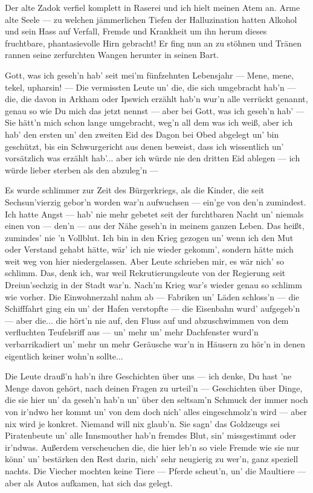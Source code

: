 Der alte Zadok verfiel komplett in Raserei und ich hielt meinen Atem an. Arme alte Seele --- zu welchen jämmerlichen Tiefen der Halluzination hatten Alkohol und sein Hass auf Verfall, Fremde und Krankheit um ihn herum dieses fruchtbare, phantasievolle Hirn gebracht! Er fing nun an zu stöhnen und Tränen rannen seine zerfurchten Wangen herunter in seinen Bart.

\glqq Gott, was ich geseh'n hab' seit mei'm fünfzehnten Lebensjahr --- Mene, mene, tekel, upharsin! --- Die vermissten Leute un' die, die sich umgebracht hab'n --- die, die davon in Arkham oder Ipswich erzählt hab'n wur'n alle verrückt genannt, genau so wie Du mich das jetzt nennst --- aber bei Gott, was ich geseh'n hab' --- Sie hätt'n mich schon lange umgebracht, weg'n all dem was ich weiß, aber ich hab' den ersten un' den zweiten Eid des Dagon bei Obed abgelegt un' bin geschützt, bis ein Schwurgericht aus denen beweist, dass ich wissentlich un' vorsätzlich was erzählt hab'... aber ich würde nie den dritten Eid ablegen --- ich würde lieber sterben als den abzuleg'n ---

Es wurde schlimmer zur Zeit des Bürgerkriegs, als die Kinder, die seit Sechsun'vierzig gebor'n worden war'n aufwuchsen --- ein'ge von den'n zumindest. Ich hatte Angst --- hab' nie mehr gebetet seit der furchtbaren Nacht un' niemals einen von --- den'n --- aus der Nähe geseh'n in meinem ganzen Leben. Das heißt, zumindes' nie 'n Vollblut. Ich bin in den Krieg gezogen un' wenn ich den Mut oder Verstand gehabt hätte, wär' ich nie wieder gekomm', sondern hätte mich weit weg von hier niedergelassen. Aber Leute schrieben mir, es wär nich' so schlimm. Das, denk ich, war weil Rekrutierungsleute von der Regierung seit Dreiun'sechzig in der Stadt war'n. Nach'm Krieg war's wieder genau so schlimm wie vorher. Die Einwohnerzahl nahm ab --- Fabriken un' Läden schloss'n --- die Schifffahrt ging ein un' der Hafen verstopfte --- die Eisenbahn wurd' aufgegeb'n --- aber die... die hört'n nie auf, den Fluss auf und abzuschwimmen von dem verfluchten Teufelsriff aus --- un' mehr un' mehr Dachfenster wurd'n verbarrikadiert un' mehr un mehr Geräusche war'n in Häusern zu hör'n in denen eigentlich keiner wohn'n sollte...

Die Leute drauß'n hab'n ihre Geschichten über uns --- ich denke, Du hast 'ne Menge davon gehört, nach deinen Fragen zu urteil'n --- Geschichten über Dinge, die sie hier un' da geseh'n hab'n un' über den seltsam'n Schmuck der immer noch von ir'ndwo her kommt un' von dem doch nich' alles eingeschmolz'n wird --- aber nix wird je konkret. Niemand will nix glaub'n. Sie sagn' das Goldzeugs sei Piratenbeute un' alle Innsmouther hab'n fremdes Blut, sin' missgestimmt oder ir'ndwas. Außerdem verscheuchen die, die hier leb'n so viele Fremde wie sie nur könn' un' bestärken den Rest darin, nich' sehr neugierig zu wer'n, ganz speziell nachts. Die Viecher mochten keine Tiere --- Pferde scheut'n, un' die Maultiere --- aber als Autos aufkamen, hat sich das gelegt.

